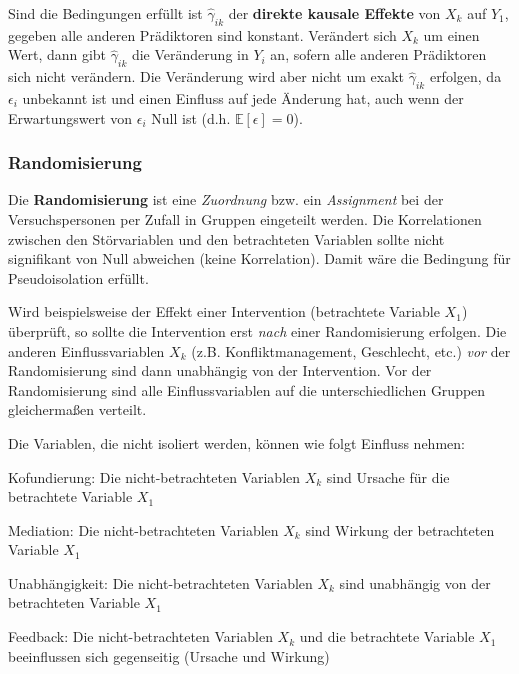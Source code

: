 \documentclass{article}
\numberwithin{equation}{section}
\begin{document}
Sind die Bedingungen erfüllt ist $\hat\gamma_{ik}$ der \textbf{direkte kausale Effekte} von $X_k$ auf $Y_1$, gegeben alle anderen Prädiktoren sind konstant. Verändert sich $X_k$ um einen Wert, dann gibt $\hat\gamma_{ik}$ die Veränderung in $Y_i$ an, sofern alle anderen Prädiktoren sich nicht verändern. Die Veränderung wird aber nicht um exakt $\hat\gamma_{ik}$ erfolgen, da $\epsilon_i$ unbekannt ist und einen Einfluss auf jede Änderung hat, auch wenn der Erwartungswert von $\epsilon_i$ Null ist (d.h. $\mathbb{E}[\epsilon] = 0$).

\subsubsection{Randomisierung}

Die \textbf{Randomisierung} ist eine \emph{Zuordnung} bzw. ein \emph{Assignment} bei der Versuchspersonen per Zufall in Gruppen eingeteilt werden. Die Korrelationen zwischen den Störvariablen und den betrachteten Variablen sollte nicht signifikant von Null abweichen (keine Korrelation). Damit wäre die Bedingung für Pseudoisolation erfüllt.

Wird beispielsweise der Effekt einer Intervention (betrachtete Variable $X_1$) überprüft, so sollte die Intervention erst \emph{nach} einer Randomisierung erfolgen. Die anderen Einflussvariablen $X_k$ (z.B. Konfliktmanagement, Geschlecht, etc.) \emph{vor} der Randomisierung sind dann unabhängig von der Intervention. Vor der Randomisierung sind alle Einflussvariablen auf die unterschiedlichen Gruppen gleichermaßen verteilt.

Die Variablen, die nicht isoliert werden, können wie folgt Einfluss nehmen:

\begin{compactitem}
\item Kofundierung: Die nicht-betrachteten Variablen $X_k$ sind Ursache für die betrachtete Variable $X_1$
\item Mediation: Die nicht-betrachteten Variablen $X_k$ sind Wirkung der betrachteten Variable $X_1$
\item Unabhängigkeit: Die nicht-betrachteten Variablen $X_k$ sind unabhängig von der betrachteten Variable $X_1$
\item Feedback: Die nicht-betrachteten Variablen $X_k$ und die betrachtete Variable $X_1$ beeinflussen sich gegenseitig (Ursache und Wirkung)
\end{compactitem}
\end{document}
